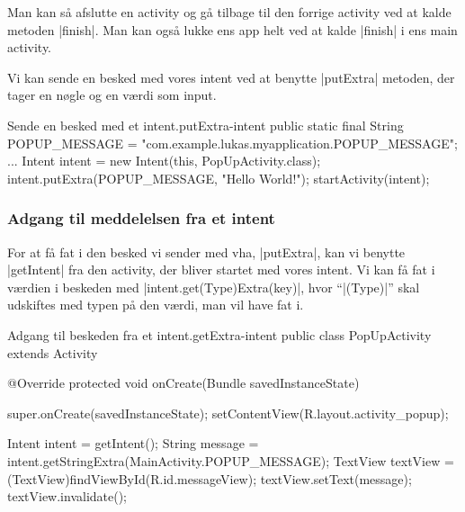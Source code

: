 Man kan så afslutte en activity og gå tilbage til den forrige activity ved at kalde metoden \JavaInline|finish|. Man kan også lukke ens app helt ved at kalde \JavaInline|finish| i ens main activity.

Vi kan sende en besked med vores intent ved at benytte \JavaInline|putExtra| metoden, der tager en nøgle og en værdi som input.

\begin{JavaCode}{Sende en besked med et intent.}{putExtra-intent}
	public static final String POPUP_MESSAGE =
		"com.example.lukas.myapplication.POPUP_MESSAGE";
	...
	Intent intent = new Intent(this, PopUpActivity.class);
	intent.putExtra(POPUP_MESSAGE, "Hello World!");
	startActivity(intent);
\end{JavaCode}

\subsubsection{Adgang til meddelelsen fra et intent}

For at få fat i den besked vi sender med vha, \JavaInline|putExtra|, kan vi benytte \JavaInline|getIntent| fra den activity, der bliver startet med vores intent. Vi kan få fat i værdien i beskeden med \JavaInline|intent.get(Type)Extra(key)|,  hvor ``\JavaInline|(Type)|'' skal udskiftes med typen på den værdi, man vil have fat i.

\begin{JavaCode}{Adgang til beskeden fra et intent.}{getExtra-intent}
	public class PopUpActivity extends Activity {
		
		@Override
		protected void onCreate(Bundle savedInstanceState) {
			super.onCreate(savedInstanceState);
			setContentView(R.layout.activity_popup);
			
			Intent intent = getIntent();
			String message = 
				intent.getStringExtra(MainActivity.POPUP_MESSAGE);
			TextView textView = 
				(TextView)findViewById(R.id.messageView);
			textView.setText(message);
			textView.invalidate();
		}
	}
\end{JavaCode}

